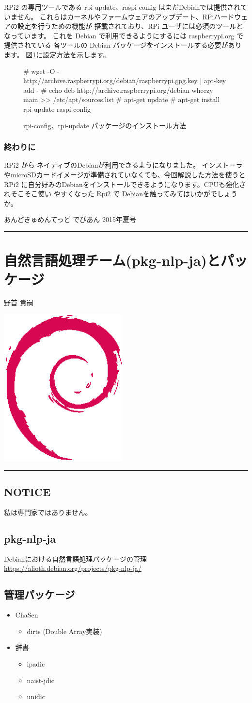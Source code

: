 \documentclass[mingoth,a4paper]{jsarticle}
\renewcommand{\dancersection}[2]{%
\newpage
あんどきゅめんてっど でびあん 2015年夏号
%
\vspace{0.1mm}\\
{\color{dancerdarkblue}\rule{\hsize}{2mm}}

%
%
\begin{minipage}[t]{0.6\hsize}
\color{dancerdarkblue}
\vspace{1cm}
\section{#1}
\hfill{}#2\\
\end{minipage}
\begin{minipage}[t]{0.4\hsize}
\vspace{-2cm}
\hfill{}\includegraphics[height=8cm]{image200502/openlogo-nd.eps}\\
\vspace{-5cm}
\end{minipage}
%
{\color{dancerlightblue}\rule{0.66\hsize}{2mm}}
%
\vspace{2cm}
}
\begin{document}
RPi2 の専用ツールである rpi-update、raspi-config はまだDebianでは提供されていません。
これらはカーネルやファームウェアのアップデート、RPiハードウェアの設定を行うための機能が
搭載されており、RPi ユーザには必須のツールとなっています。
これを Debian で利用できるようにするには raspberrypi.org で提供されている 各ツールの
Debian パッケージをインストールする必要があります。
図\ref{fig:rpirep}に設定方法を示します。

\begin{figure}[htbp]
\begin{commandline}
# wget -O - http://archive.raspberrypi.org/debian/raspberrypi.gpg.key | apt-key add - 
# echo deb http://archive.raspberrypi.org/debian wheezy main >> /etc/apt/sources.list
# apt-get update
# apt-get install rpi-update raspi-config
\end{commandline}
\label{fig:rpirep}
\caption{rpi-config、rpi-update パッケージのインストール方法}
\end{figure}

\subsubsection{終わりに}

RPi2 から ネイティブのDebianが利用できるようになりました。
インストーラやmicroSDカードイメージが準備されていなくても、今回解説した方法を使うと
RPi2 に自分好みのDebianをインストールできるようになります。CPUも強化されそこそこ使い
やすくなった Rpi2 で Debianを触ってみてはいかがでしょうか。

\dancersection{自然言語処理チーム(pkg-nlp-ja)とパッケージ}{野首 貴嗣}

\subsection{NOTICE}
 私は専門家ではありません。

\subsection{pkg-nlp-ja}
 Debianにおける自然言語処理パッケージの管理
 \url{https://alioth.debian.org/projects/pkg-nlp-ja/}

\subsection{管理パッケージ}
\begin{itemize}
\item ChaSen
\begin{itemize}
  \item dirts (Double Array実装)
\end{itemize}
\item 辞書
\begin{itemize}
\item ipadic
\item naist-jdic
\item unidic
\end{itemize}
\end{itemize}
\end{document}
